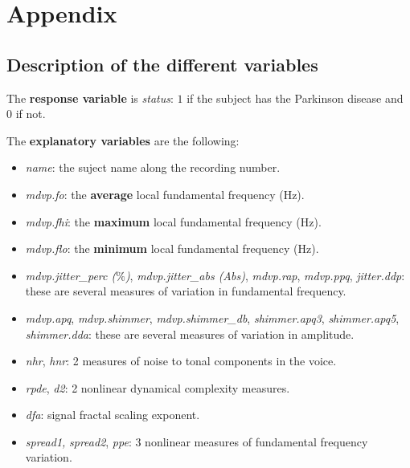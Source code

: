 \section*{Appendix}

\subsection*{Description of the different variables}

The \textbf{response variable} is \textit{status}: $1$ if the subject has the Parkinson disease and $0$ if not.

The \textbf{explanatory variables} are the following:

\begin{itemize}
	\item \textit{name}: the suject name along the recording number.
	\item \textit{mdvp.fo}: the \textbf{average} local fundamental frequency (Hz).
	\item \textit{mdvp.fhi}: the \textbf{maximum} local fundamental frequency (Hz).
	\item \textit{mdvp.flo}: the \textbf{minimum} local fundamental frequency (Hz).
	\item \textit{mdvp.jitter\_perc ($\%$)}, \textit{mdvp.jitter\_abs (Abs)}, \textit{mdvp.rap}, \textit{mdvp.ppq}, \textit{jitter.ddp}: these are several measures of variation in fundamental frequency.
	\item \textit{mdvp.apq}, \textit{mdvp.shimmer}, \textit{mdvp.shimmer\_db}, \textit{shimmer.apq3}, \textit{shimmer.apq5}, \textit{shimmer.dda}: these are several measures of variation in amplitude.
	\item \textit{nhr}, \textit{hnr}: 2 measures of noise to tonal components in the voice.
	\item \textit{rpde}, \textit{d2}: 2 nonlinear dynamical complexity measures.
	\item \textit{dfa}: signal fractal scaling exponent.
	\item \textit{spread1,} \textit{spread2}, \textit{ppe}: 3 nonlinear measures of fundamental frequency variation.
\end{itemize}

